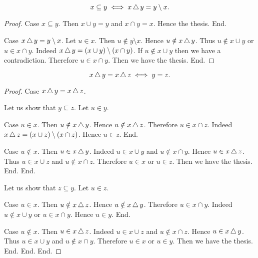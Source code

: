 \documentclass[../../set-theory.ftl.tex]{subfiles}
\begin{document}
  \begin{forthel}
    \begin{proposition}\label{SetTheory_01_04_420961}
      \[ x \subseteq y \iff x \mathop{\triangle} y = y \setminus x. \]
    \end{proposition}
    \begin{proof}
      Case $x \subseteq y$.
        Then $x \cup y = y$ and $x \cap y = x$.
        Hence the thesis.
      End.

      Case $x \mathop{\triangle} y = y \setminus x$.
        Let $u \in x$.
        Then $u \notin y \setminus x$.
        Hence $u \notin x \mathop{\triangle} y$.
        Thus $u \notin x \cup y$ or $u \in x \cap y$.
        Indeed $x \mathop{\triangle} y = (x \cup y) \setminus (x \cap y)$.
        If $u \notin x \cup y$ then we have a contradiction.
        Therefore $u \in x \cap y$.
        Then we have the thesis.
      End.
    \end{proof}

    \begin{proposition}\label{SetTheory_01_04_241267}
      \[ x \mathop{\triangle} y = x \mathop{\triangle} z \iff y = z. \]
    \end{proposition}
    \begin{proof}
      Case $x \mathop{\triangle} y = x \mathop{\triangle} z$.

        Let us show that $y \subseteq z$.
          Let $u \in y$.

          Case $u \in x$.
            Then $u \notin x \mathop{\triangle} y$.
            Hence $u \notin x \mathop{\triangle} z$.
            Therefore $u \in x \cap z$.
            Indeed $x \mathop{\triangle} z = (x \cup z) \setminus (x \cap z)$.
            Hence $u \in z$.
          End.

          Case $u \notin x$.
            Then $u \in x \mathop{\triangle} y$.
            Indeed $u \in x \cup y$ and $u \notin x \cap y$.
            Hence $u \in x \mathop{\triangle} z$.
            Thus $u \in x \cup z$ and $u \notin x \cap z$.
            Therefore $u \in x$ or $u \in z$.
            Then we have the thesis.
          End.
        End.

        Let us show that $z \subseteq y$.
          Let $u \in z$.

          Case $u \in x$.
            Then $u \notin x \mathop{\triangle} z$.
            Hence $u \notin x \mathop{\triangle} y$.
            Therefore $u \in x \cap y$.
            Indeed $u \notin x \cup y$ or $u \in x \cap y$.
            Hence $u \in y$.
          End.

          Case $u \notin x$.
            Then $u \in x \mathop{\triangle} z$.
            Indeed $u \in x \cup z$ and $u \notin x \cap z$.
            Hence $u \in x \mathop{\triangle} y$.
            Thus $u \in x \cup y$ and $u \notin x \cap y$.
            Therefore $u \in x$ or $u \in y$.
            Then we have the thesis.
          End.
        End.
      End.
    \end{proof}


\end{forthel}
\end{document}
